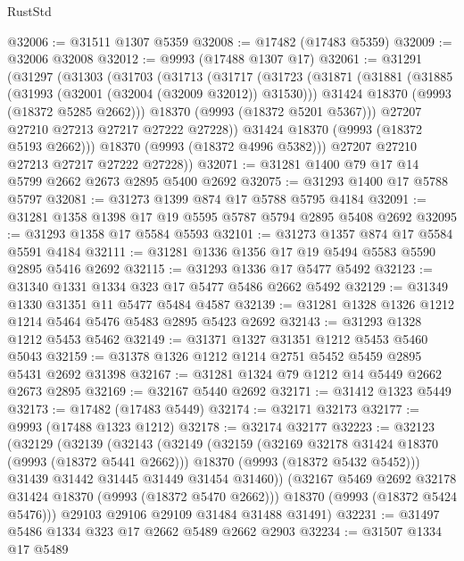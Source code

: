 \begin{lexlean}{RustStd}
\begin{coremodule}
@32006 := @31511 @1307 @5359
@32008 := @17482 (@17483 @5359)
@32009 := @32006 @32008
@32012 := @9993 (@17488 @1307 @17)
@32061 := @31291
    (@31297
      (@31303
        (@31703
          (@31713
            (@31717
              (@31723
                (@31871
                  (@31881
                    (@31885 (@31993 (@32001 (@32004 (@32009 @32012)) @31530)))
                    @31424
                    @18370
                    (@9993 (@18372 @5285 @2662)))
                  @18370
                  (@9993 (@18372 @5201 @5367)))
                @27207
                @27210
                @27213
                @27217
                @27222
                @27228))
            @31424
            @18370
            (@9993 (@18372 @5193 @2662)))
          @18370
          (@9993 (@18372 @4996 @5382)))
        @27207
        @27210
        @27213
        @27217
        @27222
        @27228))
@32071 := @31281 @1400 @79 @17 @14 @5799 @2662 @2673 @2895 @5400 @2692
@32075 := @31293 @1400 @17 @5788 @5797
@32081 := @31273 @1399 @874 @17 @5788 @5795 @4184
@32091 := @31281 @1358 @1398 @17 @19 @5595 @5787 @5794 @2895 @5408 @2692
@32095 := @31293 @1358 @17 @5584 @5593
@32101 := @31273 @1357 @874 @17 @5584 @5591 @4184
@32111 := @31281 @1336 @1356 @17 @19 @5494 @5583 @5590 @2895 @5416 @2692
@32115 := @31293 @1336 @17 @5477 @5492
@32123 := @31340 @1331 @1334 @323 @17 @5477 @5486 @2662 @5492
@32129 := @31349 @1330 @31351 @11 @5477 @5484 @4587
@32139 := @31281 @1328 @1326 @1212 @1214 @5464 @5476 @5483 @2895 @5423 @2692
@32143 := @31293 @1328 @1212 @5453 @5462
@32149 := @31371 @1327 @31351 @1212 @5453 @5460 @5043
@32159 := @31378 @1326 @1212 @1214 @2751 @5452 @5459 @2895 @5431 @2692 @31398
@32167 := @31281 @1324 @79 @1212 @14 @5449 @2662 @2673 @2895
@32169 := @32167 @5440 @2692
@32171 := @31412 @1323 @5449
@32173 := @17482 (@17483 @5449)
@32174 := @32171 @32173
@32177 := @9993 (@17488 @1323 @1212)
@32178 := @32174 @32177
@32223 := @32123
    (@32129
      (@32139
        (@32143
          (@32149
            (@32159
              (@32169 @32178 @31424 @18370 (@9993 (@18372 @5441 @2662)))
              @18370
              (@9993 (@18372 @5432 @5452)))
            @31439
            @31442
            @31445
            @31449
            @31454
            @31460))
        (@32167 @5469 @2692 @32178 @31424 @18370 (@9993 (@18372 @5470 @2662)))
        @18370
        (@9993 (@18372 @5424 @5476)))
      @29103
      @29106
      @29109
      @31484
      @31488
      @31491)
@32231 := @31497 @5486 @1334 @323 @17 @2662 @5489 @2662 @2903
@32234 := @31507 @1334 @17 @5489

\end{coremodule}
\end{lexlean}

